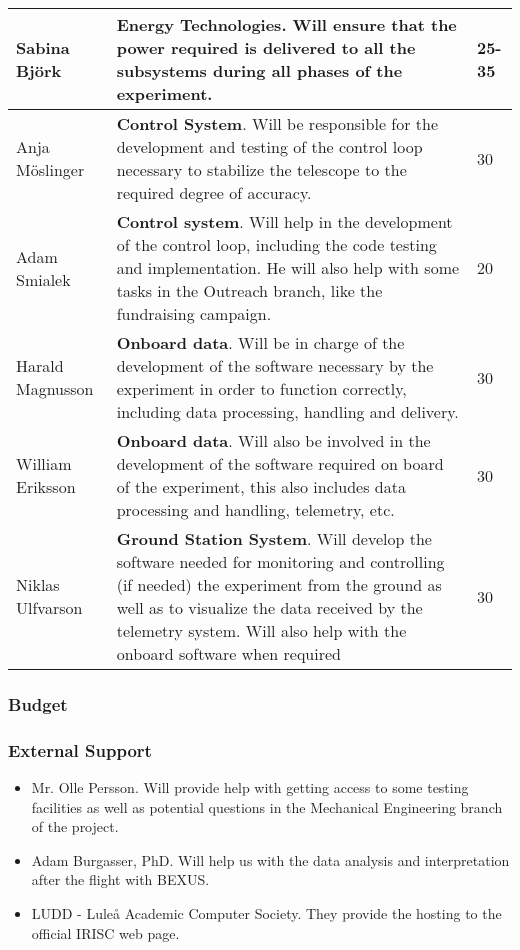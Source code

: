 \begin{longtable}{m{} | m{} | m{}}
	Sabina Bj{\"o}rk & \textbf{Energy Technologies}. Will ensure that the power required is delivered to all the subsystems during all phases of the experiment. & 25-35 \\ \hline
	Anja M{\"o}slinger & \textbf{Control System}. Will be responsible for the development and testing of the control loop necessary to stabilize the telescope to the required degree of accuracy. & 30 \\ \hline
	Adam Smialek & \textbf{Control system}.  Will help in the development of the control loop, including the code testing and implementation. He will also help with some tasks in the Outreach branch, like the fundraising campaign. & 20 \\ \hline
	Harald Magnusson & \textbf{Onboard data}. Will be in charge of the development of the software necessary by the experiment in order to function correctly, including data processing, handling and delivery. & 30 \\ \hline
	William Eriksson & \textbf{Onboard data}. Will also be involved in the development of the software required on board of the experiment, this also includes data processing and handling, telemetry, etc. & 30 \\ \hline
	Niklas Ulfvarson & \textbf{Ground Station System}. Will develop the software needed for monitoring and controlling (if needed) the experiment from the ground as well as to visualize the data received by the telemetry system. Will also help with the onboard software when required & 30 \\ \hline


\end{longtable}

\subsubsection{Budget}
\label{sec:3.2.2}




\subsubsection{External Support}

\begin{itemize}
	\item Mr. Olle Persson. Will provide help with getting access to some testing facilities as well as potential questions in the Mechanical Engineering branch of the project.
	\item Adam Burgasser, PhD. Will help us with the data analysis and interpretation after the flight with BEXUS.
	\item LUDD - Luleå Academic Computer Society. They provide the hosting to the official IRISC web page.
\end{itemize}
